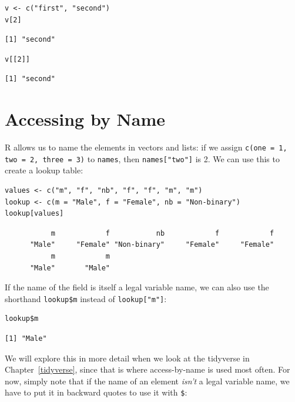 \begin{lstlisting}
v <- c("first", "second")
v[2]
\end{lstlisting}

\begin{lstlisting}
[1] "second"
\end{lstlisting}

\begin{lstlisting}
v[[2]]
\end{lstlisting}

\begin{lstlisting}
[1] "second"
\end{lstlisting}

\section{Accessing by Name}

R allows us to name the elements in vectors and lists:
if we assign \texttt{c(one = 1, two = 2, three = 3)} to \texttt{names},
then \texttt{names["two"]} is 2.
We can use this to create a lookup table:

\begin{lstlisting}
values <- c("m", "f", "nb", "f", "f", "m", "m")
lookup <- c(m = "Male", f = "Female", nb = "Non-binary")
lookup[values]
\end{lstlisting}

\begin{lstlisting}
           m            f           nb            f            f 
      "Male"     "Female" "Non-binary"     "Female"     "Female" 
           m            m 
      "Male"       "Male" 
\end{lstlisting}

If the name of the field is itself a legal variable name,
we can also use the shorthand \texttt{lookup\$m} instead of \texttt{lookup["m"]}:

\begin{lstlisting}
lookup$m
\end{lstlisting}

\begin{lstlisting}
[1] "Male"
\end{lstlisting}

We will explore this in more detail when we look at the tidyverse in Chapter~\ref{tidyverse},
since that is where access-by-name is used most often.
For now,
simply note that if the name of an element \emph{isn't} a legal variable name,
we have to put it in backward quotes to use it with \texttt{\$}:

